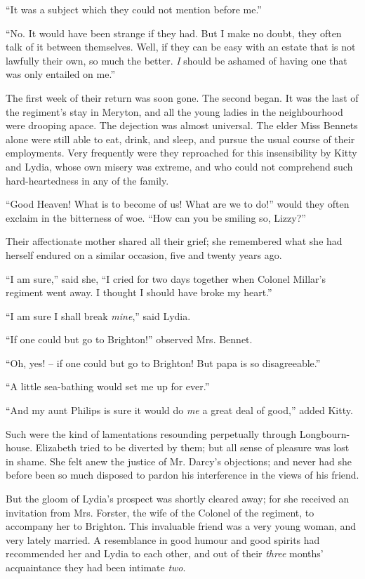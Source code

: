 “It was a subject which they could not mention before
me.”

“No. It would have been strange if they had. But
I make no doubt, they often talk of it between themselves.
Well, if they can be easy with an estate that is not lawfully
their own, so much the better. \textit{I} should be ashamed of
having one that was only entailed on me.”


The first week of their return was soon gone. The
second began. It was the last of the regiment’s stay in
Meryton, and all the young ladies in the neighbourhood
were drooping apace. The dejection was almost universal.
The elder Miss Bennets alone were still able to eat, drink,
and sleep, and pursue the usual course of their employments.
Very frequently were they reproached for this
insensibility by Kitty and Lydia, whose own misery was
extreme, and who could not comprehend such hard-heartedness
in any of the family.

“Good Heaven! What is to become of us! What are
we to do!” would they often exclaim in the bitterness
of woe. “How can you be smiling so, Lizzy?”

Their affectionate mother shared all their grief; she
remembered what she had herself endured on a similar
occasion, five and twenty years ago.

“I am sure,” said she, “I cried for two days together
when Colonel Millar’s regiment went away. I thought
I should have broke my heart.”

“I am sure I shall break \textit{mine},” said Lydia.

“If one could but go to Brighton!” observed Mrs.
Bennet.

“Oh, yes! -- if one could but go to Brighton! But papa
is so disagreeable.”

“A little sea-bathing would set me up for ever.”

“And my aunt Philips is sure it would do \textit{me} a great
deal of good,” added Kitty.

Such were the kind of lamentations resounding perpetually
through Longbourn-house. Elizabeth tried to
be diverted by them; but all sense of pleasure was lost
in shame. She felt anew the justice of Mr. Darcy’s objections;
and never had she before been so much disposed
to pardon his interference in the views of his friend.

But the gloom of Lydia’s prospect was shortly cleared
away; for she received an invitation from Mrs. Forster,
the wife of the Colonel of the regiment, to accompany her
to Brighton. This invaluable friend was a very young
woman, and very lately married. A resemblance in good
humour and good spirits had recommended her and Lydia
to each other, and out of their \textit{three} months’ acquaintance
they had been intimate \textit{two}.

